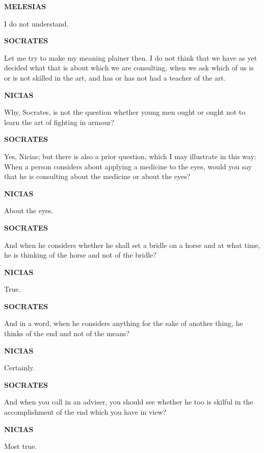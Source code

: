 \documentclass[11pt,letter]{book}
\begin{document}
\par \textbf{MELESIAS}
\par   I do not understand.

\par \textbf{SOCRATES}
\par   Let me try to make my meaning plainer then. I do not think that we have as yet decided what that is about which we are consulting, when we ask which of us is or is not skilled in the art, and has or has not had a teacher of the art.

\par \textbf{NICIAS}
\par   Why, Socrates, is not the question whether young men ought or ought not to learn the art of fighting in armour?

\par \textbf{SOCRATES}
\par   Yes, Nicias; but there is also a prior question, which I may illustrate in this way:  When a person considers about applying a medicine to the eyes, would you say that he is consulting about the medicine or about the eyes?

\par \textbf{NICIAS}
\par   About the eyes.

\par \textbf{SOCRATES}
\par   And when he considers whether he shall set a bridle on a horse and at what time, he is thinking of the horse and not of the bridle?

\par \textbf{NICIAS}
\par   True.

\par \textbf{SOCRATES}
\par   And in a word, when he considers anything for the sake of another thing, he thinks of the end and not of the means?

\par \textbf{NICIAS}
\par   Certainly.

\par \textbf{SOCRATES}
\par   And when you call in an adviser, you should see whether he too is skilful in the accomplishment of the end which you have in view?

\par \textbf{NICIAS}
\par   Most true.
\end{document}
